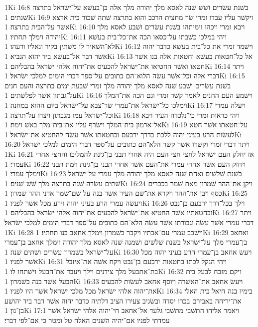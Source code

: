 1Ki 16:8  בשׁנת עשׂרים ושׁשׁ שׁנה לאסא מלך יהודה מלך אלה בן־בעשׁא על־ישׂראל בתרצה שׁנתים׃
1Ki 16:9  ויקשׁר עליו עבדו זמרי שׂר מחצית הרכב והוא בתרצה שׁתה שׁכור בית ארצא אשׁר על־הבית בתרצה׃
1Ki 16:10  ויבא זמרי ויכהו וימיתהו בשׁנת עשׂרים ושׁבע לאסא מלך יהודה וימלך תחתיו׃
1Ki 16:11  ויהי במלכו כשׁבתו על־כסאו הכה את־כל־בית בעשׁא לא־השׁאיר לו משׁתין בקיר וגאליו ורעהו׃
1Ki 16:12  וישׁמד זמרי את כל־בית בעשׁא כדבר יהוה אשׁר דבר אל־בעשׁא ביד יהוא הנביא׃
1Ki 16:13  אל כל־חטאות בעשׁא וחטאות אלה בנו אשׁר חטאו ואשׁר החטיאו את־ישׂראל להכעיס את־יהוה אלהי ישׂראל בהבליהם׃
1Ki 16:14  ויתר דברי אלה וכל־אשׁר עשׂה הלוא־הם כתובים על־ספר דברי הימים למלכי ישׂראל׃
1Ki 16:15  בשׁנת עשׂרים ושׁבע שׁנה לאסא מלך יהודה מלך זמרי שׁבעת ימים בתרצה והעם חנים על־גבתון אשׁר לפלשׁתים׃
1Ki 16:16  וישׁמע העם החנים לאמר קשׁר זמרי וגם הכה את־המלך וימלכו כל־ישׂראל את־עמרי שׂר־צבא על־ישׂראל ביום ההוא במחנה׃
1Ki 16:17  ויעלה עמרי וכל־ישׂראל עמו מגבתון ויצרו על־תרצה׃
1Ki 16:18  ויהי כראות זמרי כי־נלכדה העיר ויבא אל־ארמון בית־המלך וישׂרף עליו את־בית־מלך באשׁ וימת׃
1Ki 16:19  על־חטאתו אשׁר חטא לעשׂות הרע בעיני יהוה ללכת בדרך ירבעם ובחטאתו אשׁר עשׂה להחטיא את־ישׂראל׃
1Ki 16:20  ויתר דברי זמרי וקשׁרו אשׁר קשׁר הלא־הם כתובים על־ספר דברי הימים למלכי ישׂראל׃
1Ki 16:21  אז יחלק העם ישׂראל לחצי חצי העם היה אחרי תבני בן־גינת להמליכו והחצי אחרי עמרי׃
1Ki 16:22  ויחזק העם אשׁר אחרי עמרי את־העם אשׁר אחרי תבני בן־גינת וימת תבני וימלך עמרי׃
1Ki 16:23  בשׁנת שׁלשׁים ואחת שׁנה לאסא מלך יהודה מלך עמרי על־ישׂראל שׁתים עשׂרה שׁנה בתרצה מלך שׁשׁ־שׁנים׃
1Ki 16:24  ויקן את־ההר שׁמרון מאת שׁמר בככרים כסף ויבן את־ההר ויקרא את־שׁם העיר אשׁר בנה על שׁם־שׁמר אדני ההר שׁמרון׃
1Ki 16:25  ויעשׂה עמרי הרע בעיני יהוה וירע מכל אשׁר לפניו׃
1Ki 16:26  וילך בכל־דרך ירבעם בן־נבט ובחטאתיו אשׁר החטיא את־ישׂראל להכעיס את־יהוה אלהי ישׂראל בהבליהם׃
1Ki 16:27  ויתר דברי עמרי אשׁר עשׂה וגבורתו אשׁר עשׂה הלא־הם כתובים על־ספר דברי הימים למלכי ישׂראל׃
1Ki 16:28  וישׁכב עמרי עם־אבתיו ויקבר בשׁמרון וימלך אחאב בנו תחתיו׃
1Ki 16:29  ואחאב בן־עמרי מלך על־ישׂראל בשׁנת שׁלשׁים ושׁמנה שׁנה לאסא מלך יהודה וימלך אחאב בן־עמרי על־ישׂראל בשׁמרון עשׂרים ושׁתים שׁנה׃
1Ki 16:30  ויעשׂ אחאב בן־עמרי הרע בעיני יהוה מכל אשׁר לפניו׃
1Ki 16:31  ויהי הנקל לכתו בחטאות ירבעם בן־נבט ויקח אשׁה את־איזבל בת־אתבעל מלך צידנים וילך ויעבד את־הבעל וישׁתחו לו׃
1Ki 16:32  ויקם מזבח לבעל בית הבעל אשׁר בנה בשׁמרון׃
1Ki 16:33  ויעשׂ אחאב את־האשׁרה ויוסף אחאב לעשׂות להכעיס את־יהוה אלהי ישׂראל מכל מלכי ישׂראל אשׁר היו לפניו׃
1Ki 16:34  בימיו בנה חיאל בית האלי את־יריחה באבירם בכרו יסדה ובשׂגיב צעירו הציב דלתיה כדבר יהוה אשׁר דבר ביד יהושׁע בן־נון׃
1Ki 17:1  ויאמר אליהו התשׁבי מתשׁבי גלעד אל־אחאב חי־יהוה אלהי ישׂראל אשׁר עמדתי לפניו אם־יהיה השׁנים האלה טל ומטר כי אם־לפי דברי׃
